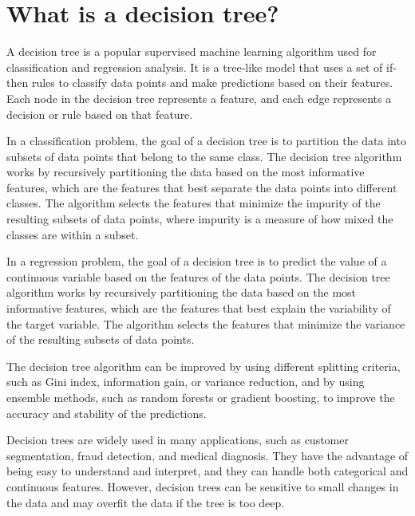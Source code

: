 \section{What is a decision tree?}
A decision tree is a popular supervised machine learning algorithm used for classification and regression analysis. It is a tree-like model that uses a set of if-then rules to classify data points and make predictions based on their features. Each node in the decision tree represents a feature, and each edge represents a decision or rule based on that feature.

In a classification problem, the goal of a decision tree is to partition the data into subsets of data points that belong to the same class. The decision tree algorithm works by recursively partitioning the data based on the most informative features, which are the features that best separate the data points into different classes. The algorithm selects the features that minimize the impurity of the resulting subsets of data points, where impurity is a measure of how mixed the classes are within a subset.

In a regression problem, the goal of a decision tree is to predict the value of a continuous variable based on the features of the data points. The decision tree algorithm works by recursively partitioning the data based on the most informative features, which are the features that best explain the variability of the target variable. The algorithm selects the features that minimize the variance of the resulting subsets of data points.

The decision tree algorithm can be improved by using different splitting criteria, such as Gini index, information gain, or variance reduction, and by using ensemble methods, such as random forests or gradient boosting, to improve the accuracy and stability of the predictions.

Decision trees are widely used in many applications, such as customer segmentation, fraud detection, and medical diagnosis. They have the advantage of being easy to understand and interpret, and they can handle both categorical and continuous features. However, decision trees can be sensitive to small changes in the data and may overfit the data if the tree is too deep.

